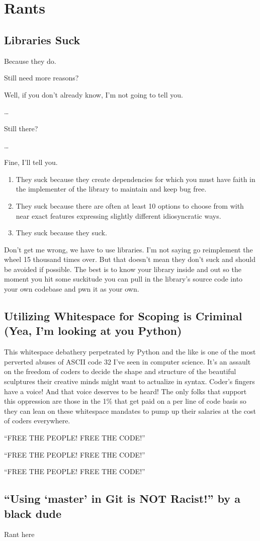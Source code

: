 \chapter{Rants}

\section{Libraries Suck}
\label{rant:librariessuck}
\par
Because they do.
\par
Still need more reasons?
\par
Well, if you don't already know, I'm not going to tell you.
\par
\dots
\par
Still there?
\par
\dots
\par
Fine, I'll tell you.
\begin{enumerate}
    \item They suck because they create dependencies for which you must have faith in the implementer of the library to maintain and keep bug free.
    \item They suck because there are often at least 10 options to choose from with near exact features expressing slightly different idiosyncratic ways.
    \item They suck because they suck.
\end{enumerate}
Don't get me wrong, we have to use libraries. I'm not saying go reimplement the wheel 15 thousand times over. But that doesn't mean they don't suck and should be avoided if possible. The best is to know your library inside and out so the moment you hit some suckitude you can pull in the library's source code into your own codebase and \gls{pwn} it as your own.

\section{Utilizing Whitespace for Scoping is Criminal (Yea, I'm looking at you Python)}
\label{rant:whitespacesucks}
\par
This whitespace debathery perpetrated by Python and the like is one of the most perverted abuses of ASCII code 32 I've seen in computer science. It's an assault on the freedom of coders to decide the shape and structure of the beautiful sculptures their creative minds might want to actualize in syntax. Coder's fingers have a voice! And that voice deserves to be heard! The only folks that support this oppression are those in the 1\% that get paid on a per line of code basis so they can lean on these whitespace mandates to pump up their salaries at the cost of coders everywhere.
\par
``FREE THE PEOPLE! FREE THE CODE!''
\par
``FREE THE PEOPLE! FREE THE CODE!''
\par
``FREE THE PEOPLE! FREE THE CODE!''

\section{``Using `master' in Git is NOT Racist!'' by a black dude}
\label{rant:racistmaster}
\par
Rant here